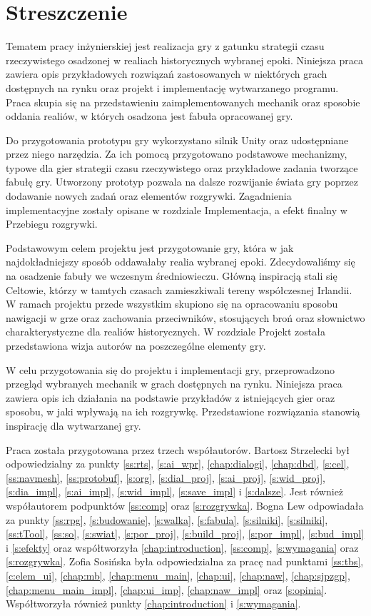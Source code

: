 \chapter*{Streszczenie}
Tematem pracy inżynierskiej jest realizacja gry z gatunku strategii czasu rzeczywistego osadzonej w realiach historycznych
wybranej epoki. Niniejsza praca zawiera opis przykładowych rozwiązań zastosowanych w niektórych grach dostępnych na rynku
oraz projekt i implementację wytwarzanego programu. Praca skupia się na przedstawieniu zaimplementowanych mechanik oraz
sposobie oddania realiów, w których osadzona jest fabuła opracowanej gry.

Do przygotowania prototypu gry wykorzystano silnik Unity oraz udostępniane przez niego narzędzia. Za ich pomocą
przygotowano podstawowe mechanizmy, typowe dla gier strategii czasu rzeczywistego oraz przykładowe zadania tworzące
fabułę gry. Utworzony prototyp pozwala na dalsze rozwijanie świata gry poprzez dodawanie nowych zadań oraz elementów
rozgrywki. Zagadnienia implementacyjne zostały opisane w rozdziale Implementacja, a efekt finalny w Przebiegu rozgrywki.

Podstawowym celem projektu jest przygotowanie gry, która w jak najdokładniejszy sposób oddawałaby realia wybranej epoki.
Zdecydowaliśmy się na osadzenie fabuły we wczesnym średniowieczu. Główną inspiracją stali się Celtowie, którzy w
tamtych czasach zamieszkiwali tereny współczesnej Irlandii. W ramach projektu przede wszystkim skupiono się na
opracowaniu sposobu nawigacji w grze oraz zachowania przeciwników, stosujących broń oraz słownictwo charakterystyczne
dla realiów historycznych. W rozdziale Projekt została przedstawiona wizja autorów na poszczególne elementy gry.

W celu przygotowania się do projektu i implementacji gry, przeprowadzono przegląd wybranych mechanik w grach dostępnych
na rynku. Niniejsza praca zawiera opis ich działania na podstawie przykładów z istniejących gier oraz sposobu, w jaki
wpływają na ich rozgrywkę. Przedstawione rozwiązania stanowią inspirację dla wytwarzanej gry.

Praca została przygotowana przez trzech współautorów. Bartosz Strzelecki był odpowiedzialny za punkty \ref{ss:rts},
\ref{s:ai_wpr}, \ref{chap:dialogi}, \ref{chap:dbd}, \ref{s:cel}, \ref{ss:navmesh}, \ref{ss:protobuf}, \ref{s:org},
\ref{s:dial_proj}, \ref{s:ai_proj}, \ref{s:wid_proj}, \ref{s:dia_impl}, \ref{s:ai_impl}, \ref{s:wid_impl},
\ref{s:save_impl} i \ref{s:dalsze}. Jest również współautorem podpunktów \ref{ss:comp} oraz \ref{s:rozgrywka}. Bogna Lew
odpowiadała za punkty \ref{ss:rpg}, \ref{s:budowanie}, \ref{s:walka}, \ref{s:fabula}, \ref{s:silniki}, \ref{s:silniki},
\ref{ss:tTool}, \ref{ss:so}, \ref{s:swiat}, \ref{s:por_proj}, \ref{s:build_proj}, \ref{s:por_impl}, \ref{s:bud_impl} i
\ref{s:efekty} oraz współtworzyła \ref{chap:introduction}, \ref{ss:comp}, \ref{s:wymagania} oraz \ref{s:rozgrywka}.
Zofia Sosińska była odpowiedzialna za pracę nad punktami \ref{ss:tbs}, \ref{c:elem_ui}, \ref{chap:mb},
\ref{chap:menu_main}, \ref{chap:ui}, \ref{chap:naw}, \ref{chap:sjpzgp}, \ref{chap:menu_main_impl}, \ref{chap:ui_imp},
\ref{chap:naw_impl} oraz \ref{s:opinia}. Współtworzyła również punkty \ref{chap:introduction} i \ref{s:wymagania}.

